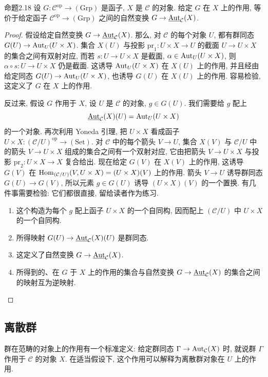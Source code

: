 \begin{origstatement}{命题}{2.18}\label{ch02:prop218}
设 $G:\mathcal C^{\mathrm{op}}\to(\mathrm{Grp})$ 是函子, $X$ 是 $\mathcal C$ 的对象. 给定 $G$ 在 $X$ 上的作用, 等价于给定函子 $\mathcal C^{\mathrm{op}}\to(\mathrm{Grp})$ 之间的自然变换 $G\to\underline{\operatorname{Aut}}_{\mathcal C}(X)$.
\end{origstatement}
\begin{proof}
假设给定自然变换 $G\to\underline{\operatorname{Aut}}_{\mathcal C}(X)$. 那么, 对 $\mathcal C$ 的每个对象 $U$, 都有群同态 $G(U)\to\operatorname{Aut}_U(U\times X)$. 集合 $X(U)$ 与投影 $\mathrm{pr}_1:U\times X\to U$ 的截面 $U\to U\times X$ 的集合之间有双射对应, 而若 $s:U\to U\times X$ 是截面, $\alpha\in\operatorname{Aut}_U(U\times X)$, 则 $\alpha\circ s:U\to U\times X$ 仍是截面. 这诱导 $\operatorname{Aut}_U(U\times X)$ 在 $X(U)$ 上的作用, 并且经由给定同态 $G(U)\to\operatorname{Aut}_U(U\times X)$, 也诱导 $G(U)$ 在 $X(U)$ 上的作用. 容易检验, 这定义了 $G$ 在 $X$ 上的作用.

反过来, 假设 $G$ 作用于 $X$, 设 $U$ 是 $\mathcal C$ 的对象, $g\in G(U)$. 我们需要给 $g$ 配上
\[
\underline{\operatorname{Aut}}_{\mathcal C}(X)(U)=\operatorname{Aut}_U(U\times X)
\]
的一个对象. 再次利用 Yoneda 引理, 把 $U\times X$ 看成函子 $U\times X:(\mathcal C/U)^{\mathrm{op}}\to(\mathrm{Set})$. 对 $\mathcal C$ 中的每个箭头 $V\to U$, 集合 $X(V)$ 与 $\mathcal C/U$ 中的箭头 $V\to U\times X$ 组成的集合之间有一个双射对应, 它由把箭头 $V\to U\times X$ 与投影 $\mathrm{pr}_2:U\times X\to X$ 复合给出. 现在给定 $G(V)$ 在 $X(V)$ 上的作用, 这诱导 $G(V)$ 在 $\operatorname{Hom}_{(\mathcal C/U)}(V,U\times X)=(U\times X)(V)$ 上的作用. 箭头 $V\to U$ 诱导群同态 $G(U)\to G(V)$, 所以元素 $g\in G(U)$ 诱导 $(U\times X)(V)$ 的一个置换. 有几件事需要检验: 它们都很直接, 留给读者作为练习.
\begin{enumerate}
\item[(i)] 这个构造为每个 $g$ 配上函子 $U\times X$ 的一个自同构, 因而配上 $(\mathcal C/U)$ 中 $U\times X$ 的一个自同构.
\item[(ii)] 所得映射 $G(U)\to\underline{\operatorname{Aut}}_{\mathcal C}(X)(U)$ 是群同态.
\item[(iii)] 这定义了自然变换 $G\to\underline{\operatorname{Aut}}_{\mathcal C}(X)$.
\item[(iv)] 所得到的、在 $G$ 于 $X$ 上的作用的集合与自然变换 $G\to\underline{\operatorname{Aut}}_{\mathcal C}(X)$ 的集合之间的映射互为逆映射.
\end{enumerate}
\end{proof}

\subsection{离散群}\label{ch02:sec222}
群在范畴的对象上的作用有一个标准定义: 给定群同态 $\Gamma\to\operatorname{Aut}_{\mathcal C}(X)$ 时, 就说群 $\Gamma$ 作用于 $\mathcal C$ 的对象 $X$. 在适当假设下, 这个作用可以解释为离散群对象在 $U$ 上的作用.

